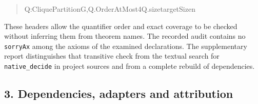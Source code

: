 \documentclass[english,11pt,a4paper]{article}
\newlength{\LeanCharWidth}
\begin{document}
\begin{quote}
\noindent \hspace*{\dimexpr 8\LeanCharWidth\relax}{\LeanSymbols ∃}\hspace*{\dimexpr 1\LeanCharWidth\relax}Q\hspace*{\dimexpr 1\LeanCharWidth\relax}:\hspace*{\dimexpr 1\LeanCharWidth\relax}CliquePartition\hspace*{\dimexpr 1\LeanCharWidth\relax}G,\hspace*{\dimexpr 1\LeanCharWidth\relax}Q.OrderAtMost\hspace*{\dimexpr 1\LeanCharWidth\relax}4\hspace*{\dimexpr 1\LeanCharWidth\relax}{\LeanSymbols ∧}\hspace*{\dimexpr 1\LeanCharWidth\relax}Q.size\hspace*{\dimexpr 1\LeanCharWidth\relax}{\LeanSymbols ≤}\hspace*{\dimexpr 1\LeanCharWidth\relax}targetSize\hspace*{\dimexpr 1\LeanCharWidth\relax}n\par
\end{quote}

These headers allow the quantifier order and exact coverage to be
checked without inferring them from theorem names. The recorded audit
contains no \nolinkurl{sorryAx} among the axioms of the examined
declarations. The supplementary report distinguishes that transitive
check from the textual search for \nolinkurl{native_decide} in project
sources and from a complete rebuild of dependencies.

\subsection{3. Dependencies, adapters and
attribution}\label{dependencies-adapters-and-attribution}
\end{document}

